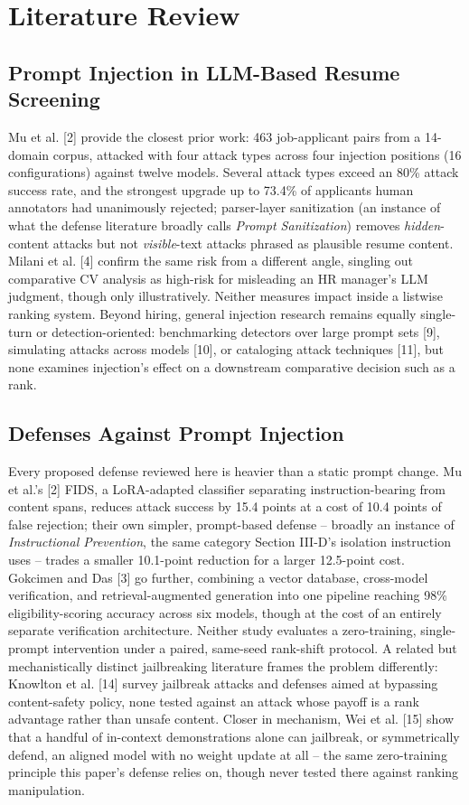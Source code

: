 \documentclass[journal]{IEEEtran}
\begin{document}
\section{Literature Review}

\subsection{Prompt Injection in LLM-Based Resume Screening}
Mu et al. [2] provide the closest prior work: 463 job-applicant pairs from a 14-domain corpus, attacked with four attack types across four injection positions (16 configurations) against twelve models. Several attack types exceed an 80\% attack success rate, and the strongest upgrade up to 73.4\% of applicants human annotators had unanimously rejected; parser-layer sanitization (an instance of what the defense literature broadly calls \emph{Prompt Sanitization}) removes \emph{hidden}-content attacks but not \emph{visible}-text attacks phrased as plausible resume content. Milani et al. [4] confirm the same risk from a different angle, singling out comparative CV analysis as high-risk for misleading an HR manager's LLM judgment, though only illustratively. Neither measures impact inside a listwise ranking system. Beyond hiring, general injection research remains equally single-turn or detection-oriented: benchmarking detectors over large prompt sets [9], simulating attacks across models [10], or cataloging attack techniques [11], but none examines injection's effect on a downstream comparative decision such as a rank.

\subsection{Defenses Against Prompt Injection}
Every proposed defense reviewed here is heavier than a static prompt change. Mu et al.'s [2] FIDS, a LoRA-adapted classifier separating instruction-bearing from content spans, reduces attack success by 15.4 points at a cost of 10.4 points of false rejection; their own simpler, prompt-based defense -- broadly an instance of \emph{Instructional Prevention}, the same category Section III-D's isolation instruction uses -- trades a smaller 10.1-point reduction for a larger 12.5-point cost. Gokcimen and Das [3] go further, combining a vector database, cross-model verification, and retrieval-augmented generation into one pipeline reaching 98\% eligibility-scoring accuracy across six models, though at the cost of an entirely separate verification architecture. Neither study evaluates a zero-training, single-prompt intervention under a paired, same-seed rank-shift protocol. A related but mechanistically distinct jailbreaking literature frames the problem differently: Knowlton et al. [14] survey jailbreak attacks and defenses aimed at bypassing content-safety policy, none tested against an attack whose payoff is a rank advantage rather than unsafe content. Closer in mechanism, Wei et al. [15] show that a handful of in-context demonstrations alone can jailbreak, or symmetrically defend, an aligned model with no weight update at all -- the same zero-training principle this paper's defense relies on, though never tested there against ranking manipulation.
\end{document}
